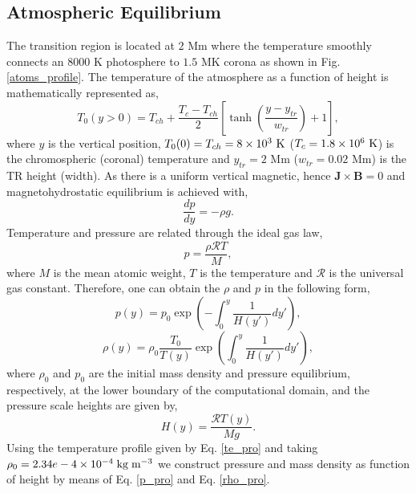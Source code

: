 \documentclass[12pt]{ociamthesis}
\newcommand{\bs}[1]{\boldsymbol{#1}}
\newcommand{\rgas}{\mathcal{R}}
\newcommand{\eref}[1]{Eq. \eqref{#1}}
\newcommand{\fref}[1]{Fig. \eqref{#1}}
\begin{document}
\subsection{Atmospheric Equilibrium}
\label{sec:atmos_equil}
The transition region is located at $2$ Mm where the temperature smoothly connects an $8000$ K photosphere to $1.5$ MK corona as shown in \fref{atoms_profile}. The temperature of the atmosphere as a function of height is mathematically represented as,   
\begin{equation}\label{te_pro}
T_0(y>0) = T_{ch}+\frac{T_{c} - T_{ch}}{2} \left[ \tanh \left( \frac{y-y_{tr}}{w_{tr}} \right)+1 \right],
\end{equation}
where $y$ is the vertical position, $T_0(0)=T_{ch}=8\times10^3 \ \rm{K}$ ($T_{c}=1.8\times10^6 \ \rm{K}$) is the chromospheric (coronal) temperature and $y_{tr}=2$ Mm ($w_{tr}=0.02$ Mm) is the TR height (width). As there is a uniform vertical magnetic, hence $\bs{J} \times \bs{B}=0$ and magnetohydrostatic equilibrium is achieved with,
\begin{equation}
\frac{dp}{dy} = - \rho g.
\end{equation}
Temperature and pressure are related through the ideal gas law,
\begin{equation}
p = \frac{ \rho \rgas T}{M},
\end{equation} 
where $M$ is the mean atomic weight, $T$ is the temperature and $\rgas$ is the universal gas constant. Therefore, one can obtain the $\rho$ and $p$ in the following form,  
\begin{equation}\label{p_pro}
p(y) = p_0 \exp \left( - \int_0^y  \frac{1}{H(y')} dy' \right), 
\end{equation} 
\begin{equation}\label{rho_pro}
\rho(y) = \rho_0 \frac{T_0}{T(y)} \exp \left( \int_0^y \frac{1}{H(y') }dy' \right),
\end{equation}
where $\rho_0$ and $p_0$ are the initial mass density and pressure equilibrium, respectively, at the lower boundary of the computational domain, and the pressure scale heights are given by,
\begin{equation}
H(y) = \frac{\rgas T(y)}{Mg}.
\end{equation}
Using the temperature profile given by \eref{te_pro} and taking $\rho_0 = 2.34e-4\times10^{-4}\;\rm{kg}\;\rm{m^{-3}}$ we construct pressure and mass density as function of height by means of \eref{p_pro} and \eref{rho_pro}.
\end{document}
